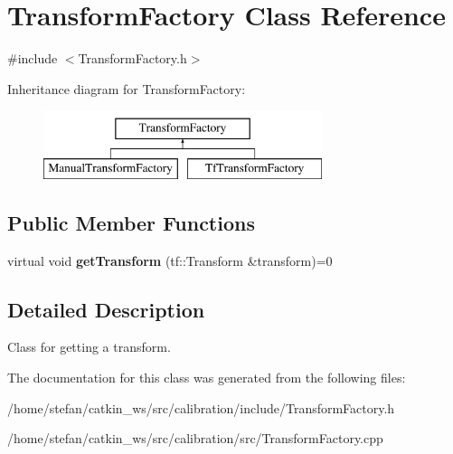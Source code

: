 \hypertarget{classTransformFactory}{\section{\-Transform\-Factory \-Class \-Reference}
\label{classTransformFactory}
}


{\ttfamily \#include $<$\-Transform\-Factory.\-h$>$}

\-Inheritance diagram for \-Transform\-Factory\-:\begin{figure}[H]
\begin{center}
\leavevmode
\includegraphics[height=2.000000cm]{classTransformFactory}
\end{center}
\end{figure}
\subsection*{\-Public \-Member \-Functions}
\begin{DoxyCompactItemize}
\item 
\hypertarget{classTransformFactory_a649ac11e65ef023dbbddb4c4a971a109}{virtual void {\bfseries get\-Transform} (tf\-::\-Transform \&transform)=0}\label{classTransformFactory_a649ac11e65ef023dbbddb4c4a971a109}

\end{DoxyCompactItemize}


\subsection{\-Detailed \-Description}
\-Class for getting a transform. 

\-The documentation for this class was generated from the following files\-:\begin{DoxyCompactItemize}
\item 
/home/stefan/catkin\-\_\-ws/src/calibration/include/\-Transform\-Factory.\-h\item 
/home/stefan/catkin\-\_\-ws/src/calibration/src/\-Transform\-Factory.\-cpp\end{DoxyCompactItemize}
